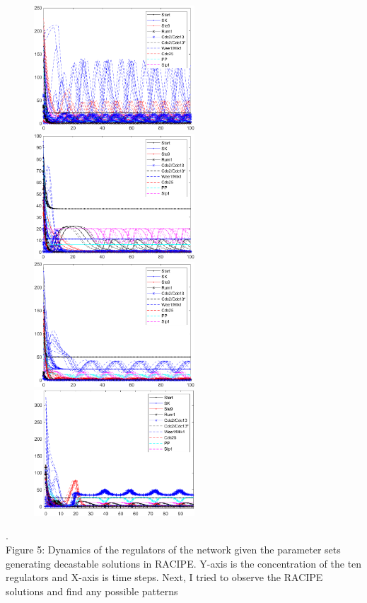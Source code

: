 \documentclass{article}
\begin{document}
\begin{figure}[H]
  \includegraphics[width=60mm, scale=0.5]{dynamics1.png}
  \includegraphics[width=60mm, scale=0.5]{dynamics2.png} 
  \includegraphics[width=60mm, scale=0.5]{dynamics3.png}
  \includegraphics[width=60mm, scale=0.5]{dynamics5.png}
\end{figure}
.\\
Figure 5: Dynamics of the regulators of the network given the parameter sets 
generating decastable solutions in RACIPE. Y-axis is the concentration of the 
ten regulators and X-axis is time steps.
\newline \newline 
Next, I tried to observe the RACIPE solutions and find any possible patterns 
\end{document}
